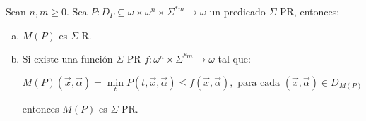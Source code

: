   \begin{lemma}
    \PN Sean $n, m \geq 0$. Sea $P: D_{P} \subseteq \omega \times \omega^{n} \times \Sigma^{\ast m} \rightarrow \omega$
    un predicado $\Sigma$-PR, entonces:

    \begin{enumerate}[a)]
      \item $M(P)$ es $\Sigma$-R.
      \item Si existe una función $\Sigma$-PR $f: \omega^{n} \times \Sigma^{\ast m} \rightarrow \omega$ tal que:

        \[
          M(P)(\vec{x},\vec{\alpha}) = \min_{t}P(t,\vec{x},\vec{\alpha}) \leq f(\vec{x},\vec{\alpha}),
          \text{ para cada }(\vec{x},\vec{\alpha}) \in D_{M(P)}
        \]

        \PN entonces $M(P)$ es $\Sigma$-PR.
    \end{enumerate}
  \end{lemma}
